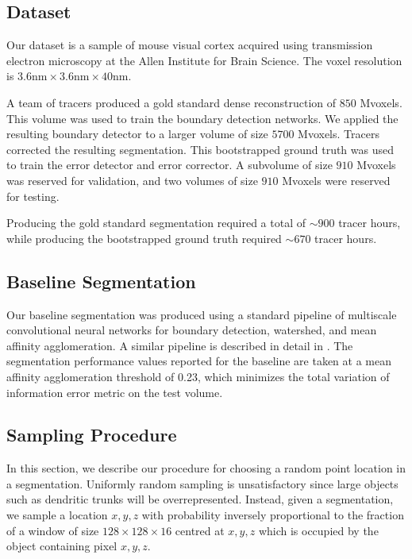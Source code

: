 \documentclass{article}
\begin{document}
\subsection{Dataset}


Our dataset is a sample of mouse visual cortex acquired using transmission electron microscopy at the Allen Institute for Brain Science. The voxel resolution is $3.6\text{nm} \times 3.6\text{nm} \times 40\text{nm}$.

A team of tracers produced a gold standard dense reconstruction of $850$ Mvoxels. This volume was used to train the boundary detection networks. We applied the resulting boundary detector to a larger volume of size $5700$ Mvoxels.  Tracers corrected the resulting segmentation. This bootstrapped ground truth was used to train the error detector and error corrector. A subvolume of size $910$ Mvoxels was reserved for validation, and two volumes of size $910$ Mvoxels were reserved for testing.

Producing the gold standard segmentation required a total of $\sim900$ tracer hours, while producing the bootstrapped ground truth required $\sim 670$ tracer hours.

\subsection{Baseline Segmentation}
Our baseline segmentation was produced using a standard pipeline of multiscale convolutional neural networks for boundary detection, watershed, and mean affinity agglomeration. A similar pipeline is described in detail in  \cite{kisuk}. The segmentation performance values reported for the baseline are taken at a mean affinity agglomeration threshold of 0.23, which minimizes the total variation of information error metric on the test volume.

\subsection{Sampling Procedure}
\label{sec:sampling}
In this section, we describe our procedure for choosing a random point location in a segmentation. Uniformly random sampling is unsatisfactory since large objects such as dendritic trunks will be overrepresented. Instead, given a segmentation, we sample a location $x,y,z$ with probability inversely proportional to the fraction of a window of size $128\times 128 \times 16$ centred at $x,y,z$ which is occupied by the object containing pixel $x,y,z$.
\end{document}
